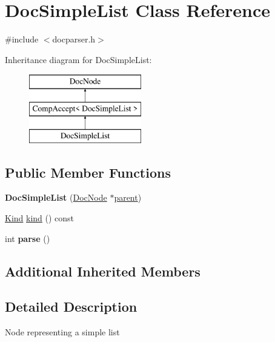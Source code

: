 \hypertarget{class_doc_simple_list}{}\section{Doc\+Simple\+List Class Reference}
\label{class_doc_simple_list}


{\ttfamily \#include $<$docparser.\+h$>$}

Inheritance diagram for Doc\+Simple\+List\+:\begin{figure}[H]
\begin{center}
\leavevmode
\includegraphics[height=3.000000cm]{class_doc_simple_list}
\end{center}
\end{figure}
\subsection*{Public Member Functions}
\begin{DoxyCompactItemize}
\item 
\mbox{\label{class_doc_simple_list_ad03cfb668ac8e84652be8d254b751a85}} 
{\bfseries Doc\+Simple\+List} (\mbox{\hyperlink{class_doc_node}{Doc\+Node}} $\ast$\mbox{\hyperlink{class_doc_node_a73e8ad29a91cfceb0968eb00db71a23d}{parent}})
\item 
\mbox{\hyperlink{class_doc_node_aebd16e89ca590d84cbd40543ea5faadb}{Kind}} \mbox{\hyperlink{class_doc_simple_list_a91f28875fab4da3e5cbb348b7a064e08}{kind}} () const
\item 
\mbox{\label{class_doc_simple_list_a0b7395b31b97e5d5a4acd5f74a778cf1}} 
int {\bfseries parse} ()
\end{DoxyCompactItemize}
\subsection*{Additional Inherited Members}


\subsection{Detailed Description}
Node representing a simple list 

